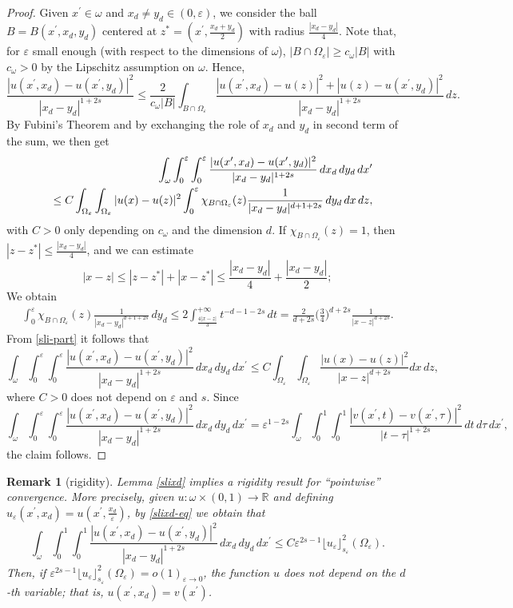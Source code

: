 \documentclass[11pt]{article}
\newtheorem{remark}[definition]{Remark}
\def\e{\varepsilon}
\begin{document}
\begin{proof}  
Given $x^\prime\in\omega$ and $x_d\neq y_d\in(0,\e)$, we consider the ball $B=B(x^\prime,x_d,y_d)$ centered at $z^\ast=(x^\prime,\frac{x_d+y_d}{2})$ with radius $\frac{|x_d-y_d|}{4}$. 
Note that, for $\e$ small enough (with respect to the dimensions of $\omega$),  
$|B\cap\Omega_\e|\geq c_\omega|B|$ with $c_\omega>0$ by the Lipschitz assumption on $\omega$. Hence, 
$$\frac{|u(x^\prime,x_d)-u(x^\prime,y_d)|^2}{|x_d-y_d|^{1+2s}}\leq \frac{2}{c_\omega|B|}\int_{B\cap\Omega_\e} \frac{|u(x^\prime,x_d)-u(z)|^2+|u(z)-u(x^\prime,y_d)|^2}{|x_d-y_d|^{1+2s}}\, dz.$$ 
By Fubini's Theorem and by exchanging the role of $x_d$ and $y_d$ in second term of the sum, we then get 
\begin{eqnarray}\label{sli-part}
&&\hspace{-1cm}\int_\omega\int_0^\e\int_0^\e\frac{|u(x^\prime,x_d)-u(x^\prime,y_d)|^2}{|x_d-y_d|^{1+2s}}\, dx_d\, dy_d\, dx^\prime\nonumber\\
&&\leq %
C\int_{\Omega_\e}\int_{\Omega_\e}|u(x)-u(z)|^2 \int_0^\e\chi_{B\cap\Omega_\e}(z) \frac{1}{|x_d-y_d|^{d+1+2s}}\, dy_d\, dx\, dz,
\end{eqnarray}
with $C>0$ only depending on $c_\omega$ and the dimension $d$. 
If $\chi_{B\cap\Omega_\e}(z)=1$, then $|z-z^\ast|\leq \frac{|x_d-y_d|}{4}$, and we can estimate 
$$|x-z|\leq |z-z^\ast|+|x-z^\ast|\leq \frac{|x_d-y_d|}{4} +\frac{|x_d-y_d|}{2};$$ 
We obtain 
\begin{eqnarray*}
\int_0^\e\chi_{B\cap\Omega_\e}(z) \frac{1}{|x_d-y_d|^{d+1+2s}}\, dy_d \leq 2\int_{\frac{4|x-z|}{3}}^{+\infty} t^{-d-1-2s}\, dt=\frac{2}{d+2s}\Big(\frac{3}{4}\Big)^{d+2s} \frac{1}{|x-z|^{d+2s}}.
\end{eqnarray*}
From \eqref{sli-part} it follows that 
\begin{equation}
\int_\omega\int_0^\e\int_0^\e\frac{|u(x^\prime,x_d)-u(x^\prime,y_d)|^2}{|x_d-y_d|^{1+2s}}\, dx_d\, dy_d\, dx^\prime\leq C\int_{\Omega_\e}\int_{\Omega_\e}\frac{|u(x)-u(z)|^2}{|x-z|^{d+2s}}  dx\, dz, 
\end{equation} 
where $C>0$ does not depend on $\e$ and $s$. 
Since 
$$\int_\omega\int_0^\e\int_0^\e\frac{|u(x^\prime,x_d)-u(x^\prime,y_d)|^2}{|x_d-y_d|^{1+2s}}\, dx_d\, dy_d\, dx^\prime=
\e^{1-2s}\int_\omega\int_0^1\int_0^1\frac{|v(x^\prime,t)-v(x^\prime,\tau)|^2}{|t-\tau|^{1+2s}}\, dt\, d\tau\, dx^\prime,
$$
the claim follows.
\end{proof}

\begin{remark}[rigidity]\label{rigidity-rm}\rm 
Lemma \ref{slixd} implies a rigidity result for ``pointwise'' convergence.  
More precisely, given $u\colon\omega\times (0,1)\to\mathbb R$ and defining 
$u_\e(x^\prime,x_d)=u(x^\prime, \frac{x_d}{\e})$, 
by \eqref{slixd-eq} we obtain that 
$$\int_\omega\int_0^1\int_0^1 \frac{|u(x^\prime,x_d)-u(x^\prime,y_d)|^2}{|x_d-y_d|^{1+2s}}\, dx_d\, dy_d\, dx^\prime\leq C\e^{2s-1}\lfloor u_\e\rfloor_{s_\e}^2(\Omega_\e).$$ 
Then, if $\e^{2s-1}\lfloor u_\e\rfloor_{s_\e}^2(\Omega_\e)=o(1)_{\e\to 0}$, the function $u$ does not depend on the $d$-th variable; that is, $u(x^\prime,x_d)=v(x^\prime)$. 
\end{remark}
\end{document}
